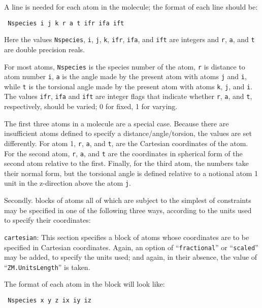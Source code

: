 \documentclass[11pt]{article}
\begin{document}
\begin{description}
A line is needed for each atom in the molecule; the format of each line should be:

\noindent\texttt{    Nspecies i j k r a t ifr ifa ift}

Here the values \texttt{Nspecies}, \texttt{i}, \texttt{j}, \texttt{k},
\texttt{ifr}, \texttt{ifa}, and \texttt{ift} are integers and
\texttt{r}, \texttt{a}, and \texttt{t} are double precision reals.

For most atoms, \texttt{Nspecies} is the species number of the atom,
\texttt{r} is distance to atom number \texttt{i}, \texttt{a} is the
angle made by the present atom with atoms \texttt{j} and \texttt{i},
while \texttt{t} is the torsional angle made by the present atom with
atoms \texttt{k}, \texttt{j}, and \texttt{i}. The values \texttt{ifr},
\texttt{ifa} and \texttt{ift} are integer flags that indicate whether
\texttt{r}, \texttt{a}, and \texttt{t}, respectively, should be
varied; 0 for fixed, 1 for varying.


The first three atoms in a molecule are a special case. Because there
are insufficient atoms defined to specify a distance/angle/torsion,
the values are set differently. For atom 1, \texttt{r}, \texttt{a},
and \texttt{t}, are the Cartesian coordinates of the atom.  For the
second atom, \texttt{r}, \texttt{a}, and \texttt{t} are the
coordinates in spherical form of the second atom relative to the
first. Finally, for the third atom, the numbers take their normal
form, but the torsional angle is defined relative to a notional atom 1
unit in the z-direction above the atom \texttt{j}.

Secondly. blocks of atoms all of which are subject to the simplest of constraints
may be specified in one of the following three ways, according to the units used
to specify their coordinates:


\item \texttt{cartesian}: This section specifies a block of atoms
whose coordinates are to be specified in Cartesian coordinates. Again,
an option of ``\texttt{fractional}'' or ``\texttt{scaled}'' may be
added, to specify the units used; and again, in their absence, the
value of ``\texttt{ZM.UnitsLength}'' is taken.

The format of each atom in the block will look like:

\noindent\texttt{      Nspecies x y z ix iy iz}


\end{description}
\end{document}
